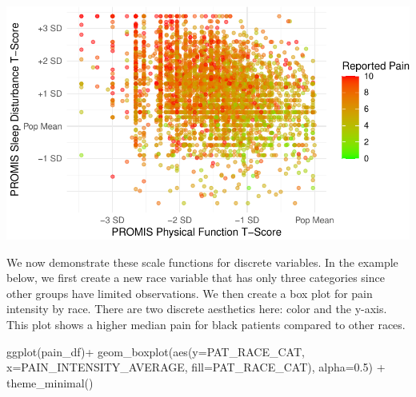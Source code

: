 \documentclass[
  letterpaper,
]{krantz}
\makeatletter
\newenvironment{Shaded}{\begin{snugshade}}{\end{snugshade}}
\newcommand{\AttributeTok}[1]{\textcolor[rgb]{0.40,0.45,0.13}{#1}}
\newcommand{\FloatTok}[1]{\textcolor[rgb]{0.68,0.00,0.00}{#1}}
\newcommand{\FunctionTok}[1]{\textcolor[rgb]{0.28,0.35,0.67}{#1}}
\newcommand{\NormalTok}[1]{\textcolor[rgb]{0.00,0.23,0.31}{#1}}
\newcommand{\OtherTok}[1]{\textcolor[rgb]{0.00,0.23,0.31}{#1}}
\newcommand{\SpecialCharTok}[1]{\textcolor[rgb]{0.37,0.37,0.37}{#1}}
\newcommand{\StringTok}[1]{\textcolor[rgb]{0.13,0.47,0.30}{#1}}
\newenvironment{kframe}{%
\medskip{}
\setlength{\fboxsep}{.8em}
 \def\at@end@of@kframe{}%
 \ifinner\ifhmode%
  \def\at@end@of@kframe{\end{minipage}}%
  \begin{minipage}{\columnwidth}%
 \fi\fi%
 \def\FrameCommand##1{\hskip\@totalleftmargin \hskip-\fboxsep
 \colorbox{shadecolor}{##1}\hskip-\fboxsep
     \hskip-\linewidth \hskip-\@totalleftmargin \hskip\columnwidth}%
 \MakeFramed {\advance\hsize-\width
   \@totalleftmargin\z@ \linewidth\hsize
   \@setminipage}}%
 {\par\unskip\endMakeFramed%
 \at@end@of@kframe}
\renewenvironment{Shaded}{\begin{kframe}}{\end{kframe}}
\makeatother
\begin{document}
\begin{center}
\includegraphics[width=1\textwidth,height=\textheight]{book/visualization_ggplot_files/figure-pdf/unnamed-chunk-10-1.pdf}
\end{center}

We now demonstrate these scale functions for discrete variables. In the
example below, we first create a new race variable that has only three
categories since other groups have limited observations. We then create
a box plot for pain intensity by race. There are two discrete aesthetics
here: color and the y-axis. This plot shows a higher median pain for
black patients compared to other races.

\begin{Shaded}
\end{Shaded}

\begin{Shaded}
\begin{Highlighting}[]
\FunctionTok{ggplot}\NormalTok{(pain\_df)}\SpecialCharTok{+}
  \FunctionTok{geom\_boxplot}\NormalTok{(}\FunctionTok{aes}\NormalTok{(}\AttributeTok{y=}\NormalTok{PAT\_RACE\_CAT, }\AttributeTok{x=}\NormalTok{PAIN\_INTENSITY\_AVERAGE, }
                   \AttributeTok{fill=}\NormalTok{PAT\_RACE\_CAT), }\AttributeTok{alpha=}\FloatTok{0.5}\NormalTok{) }\SpecialCharTok{+}
  \FunctionTok{theme\_minimal}\NormalTok{()}
\end{Highlighting}
\end{Shaded}
\end{document}
